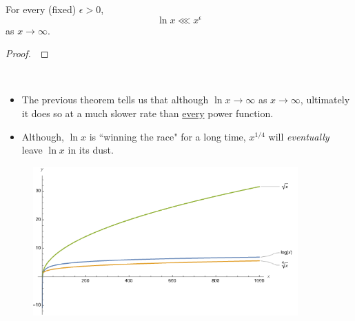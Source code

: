 \newpage

\begin{theorem}
For every (fixed) $\epsilon>0$, 
\begin{equation*}
\ln x\lll x^\epsilon
\end{equation*}
as $x\to\infty$.
\end{theorem}
\ifdefined\SOLUTION
{}
\else
\begin{proof}\,

\vspace{1.25in}
\end{proof}
\fi

\vfill

\begin{remark}\,
\begin{itemize}
\item The previous theorem tells us that although $\ln x\to\infty$ as $x\to\infty$, ultimately it does so at a much slower rate than \underline{every} power function.
\item Although, $\ln x$ is ``winning the race" for a long time, $x^{1/4}$ will \textit{eventually} leave $\ln x$ in its dust.
\end{itemize}
\end{remark}

\begin{figure}[H]
\includegraphics[width=4in]{img/log-growth}
\end{figure}

